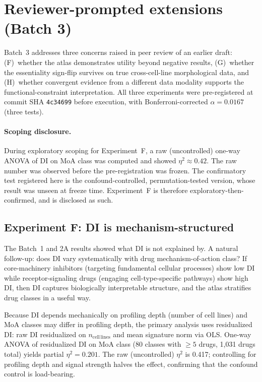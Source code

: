 \documentclass[11pt]{article}
\begin{document}
\section{Reviewer-prompted extensions (Batch 3)}
\label{sec:batch3}

Batch~3 addresses three concerns raised in peer review of an earlier
draft: (F)~whether the atlas demonstrates utility beyond negative
results, (G)~whether the essentiality sign-flip survives on true
cross-cell-line morphological data, and (H)~whether convergent evidence
from a different data modality supports the functional-constraint
interpretation.  All three experiments were pre-registered at commit SHA
\texttt{4c34699} before execution, with Bonferroni-corrected
$\alpha = 0.0167$ (three tests).

\paragraph{Scoping disclosure.}
During exploratory scoping for Experiment~F, a raw (uncontrolled)
one-way ANOVA of DI on MoA class was computed and showed
$\eta^2 \approx 0.42$.  The raw number was observed before the
pre-registration was frozen.  The confirmatory test registered here is
the confound-controlled, permutation-tested version, whose result was
unseen at freeze time.  Experiment~F is therefore
exploratory-then-confirmed, and is disclosed as such.

\subsection{Experiment F: DI is mechanism-structured}

The Batch~1 and 2A results showed what DI is not explained by.  A
natural follow-up: does DI vary systematically with drug
mechanism-of-action class?  If core-machinery inhibitors (targeting
fundamental cellular processes) show low DI while receptor-signaling
drugs (engaging cell-type-specific pathways) show high DI, then DI
captures biologically interpretable structure, and the atlas stratifies
drug classes in a useful way.

Because DI depends mechanically on profiling depth (number of cell
lines) and MoA classes may differ in profiling depth, the primary
analysis uses residualized DI: raw DI residualized on
$n_{\mathrm{cell\,lines}}$ and mean signature norm via OLS.  One-way
ANOVA of residualized DI on MoA class (80 classes with $\geq 5$ drugs,
1{,}031 drugs total) yields partial $\eta^2 = 0.201$.  The raw
(uncontrolled) $\eta^2$ is 0.417; controlling for profiling depth and
signal strength halves the effect, confirming that the confound control
is load-bearing.
\end{document}
